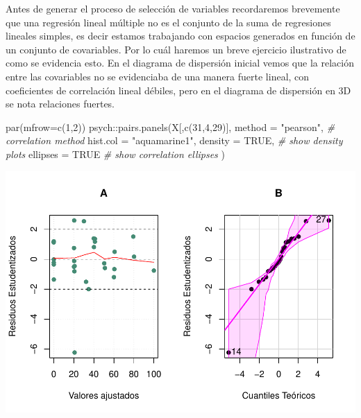 \documentclass[
]{article}
\newenvironment{Shaded}{\begin{snugshade}}{\end{snugshade}}
\newcommand{\AttributeTok}[1]{\textcolor[rgb]{0.77,0.63,0.00}{#1}}
\newcommand{\CommentTok}[1]{\textcolor[rgb]{0.56,0.35,0.01}{\textit{#1}}}
\newcommand{\ConstantTok}[1]{\textcolor[rgb]{0.00,0.00,0.00}{#1}}
\newcommand{\DecValTok}[1]{\textcolor[rgb]{0.00,0.00,0.81}{#1}}
\newcommand{\FunctionTok}[1]{\textcolor[rgb]{0.00,0.00,0.00}{#1}}
\newcommand{\NormalTok}[1]{#1}
\newcommand{\SpecialCharTok}[1]{\textcolor[rgb]{0.00,0.00,0.00}{#1}}
\newcommand{\StringTok}[1]{\textcolor[rgb]{0.31,0.60,0.02}{#1}}
\begin{document}
Antes de generar el proceso de selección de variables recordaremos
brevemente que una regresión lineal múltiple no es el conjunto de la
suma de regresiones lineales simples, es decir estamos trabajando con
espacios generados en función de un conjunto de covariables. Por lo cuál
haremos un breve ejercicio ilustrativo de como se evidencia esto. En el
diagrama de dispersión inicial vemos que la relación entre las
covariables no se evidenciaba de una manera fuerte lineal, con
coeficientes de correlación lineal débiles, pero en el diagrama de
dispersión en 3D se nota relaciones fuertes.

\begin{Shaded}
\begin{Highlighting}[]
\FunctionTok{par}\NormalTok{(}\AttributeTok{mfrow=}\FunctionTok{c}\NormalTok{(}\DecValTok{1}\NormalTok{,}\DecValTok{2}\NormalTok{))}
\NormalTok{psych}\SpecialCharTok{::}\FunctionTok{pairs.panels}\NormalTok{(X[,}\FunctionTok{c}\NormalTok{(}\DecValTok{31}\NormalTok{,}\DecValTok{4}\NormalTok{,}\DecValTok{29}\NormalTok{)], }
                      \AttributeTok{method =} \StringTok{"pearson"}\NormalTok{, }\CommentTok{\# correlation method}
                      \AttributeTok{hist.col =} \StringTok{"aquamarine1"}\NormalTok{,}
                      \AttributeTok{density =} \ConstantTok{TRUE}\NormalTok{,  }\CommentTok{\# show density plots}
                      \AttributeTok{ellipses =} \ConstantTok{TRUE} \CommentTok{\# show correlation ellipses}
\NormalTok{  )}
\end{Highlighting}
\end{Shaded}

\includegraphics{Taller-2-Regresion-Multiple-Aplicada_files/figure-latex/unnamed-chunk-4-1.pdf}
\end{document}
